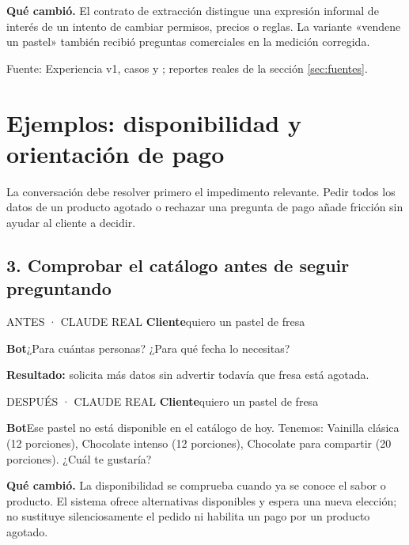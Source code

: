 \documentclass[11pt,a4paper]{article}
\newcommand{\code}[1]{\texttt{\detokenize{#1}}}
\newcommand{\source}[1]{\par{\footnotesize\color{muted}Fuente: #1.\par}}
\newcommand{\habla}[2]{\textbf{#1}\enspace #2\par\smallskip}
\begin{document}
\textbf{Qué cambió.} El contrato de extracción distingue una expresión informal
de interés de un intento de cambiar permisos, precios o reglas. La variante
«vendene un pastel» también recibió preguntas comerciales en la medición corregida.
\source{Experiencia v1, casos \code{continuidad_no} y \code{coloquial_hambre}; reportes reales de la sección \ref{sec:fuentes}}

\newpage
\section{Ejemplos: disponibilidad y orientación de pago}
La conversación debe resolver primero el impedimento relevante. Pedir todos los
datos de un producto agotado o rechazar una pregunta de pago añade fricción sin
ayudar al cliente a decidir.

\subsection{3. Comprobar el catálogo antes de seguir preguntando}
\begin{tcbraster}[raster columns=2,raster column skip=4mm,raster equal height=rows]
\begin{dialogo}[colback=amberbg,colbacktitle=amber]{ANTES · CLAUDE REAL}
\habla{Cliente}{quiero un pastel de fresa}
\habla{Bot}{¿Para cuántas personas? ¿Para qué fecha lo necesitas?}
\textcolor{amber}{\textbf{Resultado:} solicita más datos sin advertir todavía que fresa está agotada.}
\end{dialogo}
\begin{dialogo}{DESPUÉS · CLAUDE REAL}
\habla{Cliente}{quiero un pastel de fresa}
\habla{Bot}{Ese pastel no está disponible en el catálogo de hoy. Tenemos: Vainilla clásica (12 porciones), Chocolate intenso (12 porciones), Chocolate para compartir (20 porciones). ¿Cuál te gustaría?}
\end{dialogo}
\end{tcbraster}

\textbf{Qué cambió.} La disponibilidad se comprueba cuando ya se conoce el sabor
o producto. El sistema ofrece alternativas disponibles y espera una nueva elección;
no sustituye silenciosamente el pedido ni habilita un pago por un producto agotado.
\end{document}
